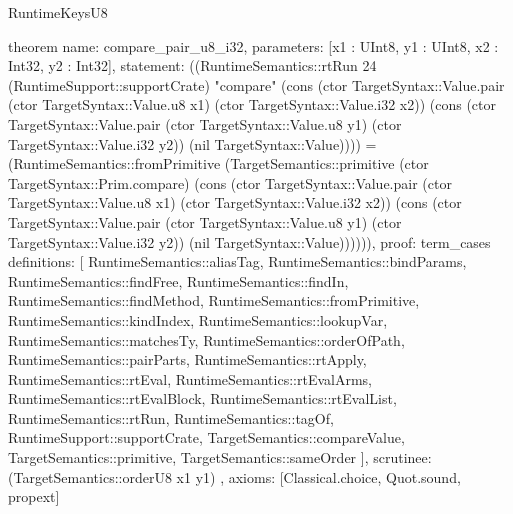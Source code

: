 \begin{lexlean}{RuntimeKeysU8}
\begin{semanticmodule}
theorem{
  name: compare_pair_u8_i32,
  parameters: [x1 : UInt8, y1 : UInt8, x2 : Int32, y2 : Int32],
  statement: ((RuntimeSemantics::rtRun 24 (RuntimeSupport::supportCrate) "compare" (cons (ctor TargetSyntax::Value.pair (ctor TargetSyntax::Value.u8 x1) (ctor TargetSyntax::Value.i32 x2)) (cons (ctor TargetSyntax::Value.pair (ctor TargetSyntax::Value.u8 y1) (ctor TargetSyntax::Value.i32 y2)) (nil TargetSyntax::Value)))) = (RuntimeSemantics::fromPrimitive (TargetSemantics::primitive (ctor TargetSyntax::Prim.compare) (cons (ctor TargetSyntax::Value.pair (ctor TargetSyntax::Value.u8 x1) (ctor TargetSyntax::Value.i32 x2)) (cons (ctor TargetSyntax::Value.pair (ctor TargetSyntax::Value.u8 y1) (ctor TargetSyntax::Value.i32 y2)) (nil TargetSyntax::Value)))))),
  proof: term_cases{
    definitions: [
      RuntimeSemantics::aliasTag,
      RuntimeSemantics::bindParams,
      RuntimeSemantics::findFree,
      RuntimeSemantics::findIn,
      RuntimeSemantics::findMethod,
      RuntimeSemantics::fromPrimitive,
      RuntimeSemantics::kindIndex,
      RuntimeSemantics::lookupVar,
      RuntimeSemantics::matchesTy,
      RuntimeSemantics::orderOfPath,
      RuntimeSemantics::pairParts,
      RuntimeSemantics::rtApply,
      RuntimeSemantics::rtEval,
      RuntimeSemantics::rtEvalArms,
      RuntimeSemantics::rtEvalBlock,
      RuntimeSemantics::rtEvalList,
      RuntimeSemantics::rtRun,
      RuntimeSemantics::tagOf,
      RuntimeSupport::supportCrate,
      TargetSemantics::compareValue,
      TargetSemantics::primitive,
      TargetSemantics::sameOrder
    ],
    scrutinee: (TargetSemantics::orderU8 x1 y1)
  },
  axioms: [Classical.choice, Quot.sound, propext]
}


\end{semanticmodule}
\end{lexlean}
